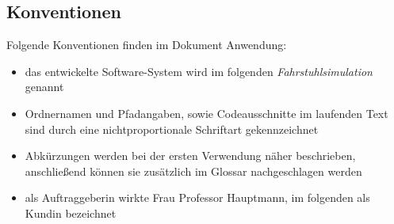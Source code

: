 \subsection*{Konventionen}
Folgende Konventionen finden im Dokument Anwendung:\\
\begin{itemize}
	\item das entwickelte Software-System wird im folgenden \textit{Fahrstuhlsimulation} genannt
	\item Ordnernamen und Pfadangaben, sowie Codeausschnitte im laufenden Text sind durch eine nichtproportionale Schriftart gekennzeichnet
	\item Abkürzungen werden bei der ersten Verwendung näher beschrieben, anschließend können sie zusätzlich im Glossar nachgeschlagen werden
	\item als Auftraggeberin wirkte Frau Professor Hauptmann, im folgenden als Kundin bezeichnet
\end{itemize}
